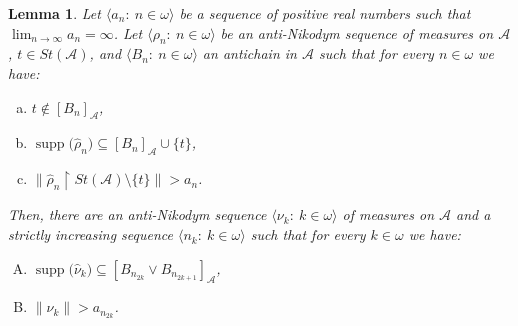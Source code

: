 \documentclass[a4paper,11pt,fleqn]{amsart}
\newtheorem{lemma}[theorem]{Lemma}
\theoremstyle{definition}
\theoremstyle{remark}
\numberwithin{equation}{section}
\newcommand{\N}{\mathbb{N}}
\newcommand{\aA}{\mathcal{A}}
\newcommand{\rstr}{\restriction}
\newcommand{\sm}{\setminus}
\newcommand{\sub}{\subseteq}
\DeclareMathOperator{\supp}{supp}
\newcommand{\wh}{\widehat}
\newcommand{\seqn}[1]{\big\langle#1\colon\ n\io\big\rangle}
\newcommand{\seqk}[1]{\big\langle#1\colon\ k\io\big\rangle}
\newcommand{\clopen}[1]{\left[#1\right]}
\newcommand{\io}{\in\omega}%
\begin{document}
\begin{lemma}\label{lemma:aN_disjointification_t}
Let $\seqn{a_n}$ be a sequence of positive real numbers such that $\lim_{n\to\infty}a_n=\infty$. Let $\seqn{\rho_n}$ be an anti-Nikodym sequence of measures on $\aA$, $t\in St(\aA)$, and $\seqn{B_n}$ an antichain in $\aA$ such that for every $n\io$ we have:
\begin{enumerate}[(a)]
	\item $t\not\in\clopen{B_n}_\aA$,
	\item $\supp\big(\wh{\rho}_n\big)\sub\clopen{B_n}_\aA\cup\{t\}$,
	\item $\big\|\wh{\rho}_n\rstr St(\aA)\sm\{t\}\big\|>a_n$.
\end{enumerate}
Then, there are an anti-Nikodym sequence $\seqk{\nu_k}$ of measures on $\aA$ and a strictly increasing sequence $\seqk{n_k}$ such that for every $k\io$ we have:
\begin{enumerate}[(A)]
	\item $\supp\big(\wh{\nu}_k\big)\sub\clopen{B_{n_{2k}}\vee B_{n_{2k+1}}}_\aA$,
	\item $\big\|\nu_k\big\|>a_{n_{2k}}$.
\end{enumerate}
\end{lemma}
\end{document}
